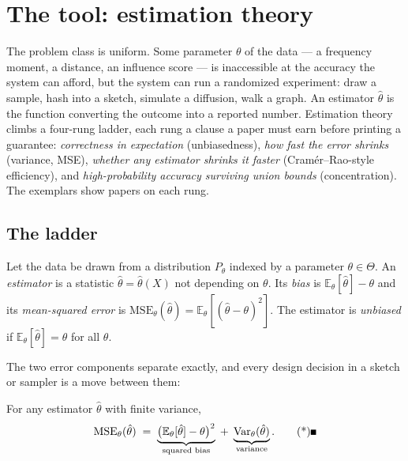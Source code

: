 \section{The tool: estimation theory}

The problem class is uniform. Some parameter $\theta$ of the data --- a frequency moment, a
distance, an influence score --- is inaccessible at the accuracy the system can afford, but
the system can run a randomized experiment: draw a sample, hash into a sketch, simulate a
diffusion, walk a graph. An estimator $\hat\theta$ is the function converting the outcome
into a reported number. Estimation theory climbs a four-rung ladder, each rung a clause a
paper must earn before printing a guarantee: \emph{correctness in expectation}
(unbiasedness), \emph{how fast the error shrinks} (variance, MSE), \emph{whether any
estimator shrinks it faster} (Cram\'er--Rao-style efficiency), and \emph{high-probability
accuracy surviving union bounds} (concentration). The exemplars show papers on each rung.

\subsection{The ladder}
\label{sec:est-ladder}

\begin{definition}\label{def:est-estimator}
Let the data be drawn from a distribution $P_\theta$ indexed by a parameter $\theta \in \Theta$.
An \emph{estimator} is a statistic $\hat\theta = \hat\theta(X)$ not depending on $\theta$. Its
\emph{bias} is $\mathbb{E}_\theta[\hat\theta] - \theta$ and its \emph{mean-squared error} is
$\mathrm{MSE}_\theta(\hat\theta) = \mathbb{E}_\theta[(\hat\theta-\theta)^2]$. The estimator is
\emph{unbiased} if $\mathbb{E}_\theta[\hat\theta] = \theta$ for all $\theta$.
\end{definition}

The two error components separate exactly, and every design decision in a sketch or sampler is a
move between them:

\begin{proposition}\label{prop:est-mse}
For any estimator $\hat\theta$ with finite variance,
\[
\mathrm{MSE}_\theta(\hat\theta)
\;=\;
\underbrace{\bigl(\mathbb{E}_\theta[\hat\theta]-\theta\bigr)^2}_{\text{squared bias}}
\;+\;
\underbrace{\operatorname{Var}_\theta(\hat\theta)}_{\text{variance}}. \eopm
\]
\end{proposition}


